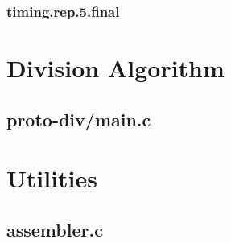 \documentclass[11pt,letterpaper,final]{article}
\begin{document}
\subsubsection{timing.rep.5.final}
\label{s3/timing.rep.5.final}
\begin{scriptsize}
\end{scriptsize}

\section{Division Algorithm}
\subsection{proto-div/main.c}


\section{ Utilities }
\subsection{ assembler.c }
\end{document}
